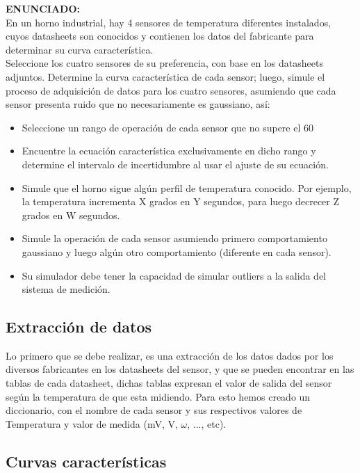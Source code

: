 \documentclass[conference]{IEEEtran}
\begin{document}
\textbf{ENUNCIADO:}\\

En un horno industrial, hay 4 sensores de temperatura diferentes instalados, cuyos datasheets son conocidos y contienen los datos del fabricante para determinar su curva característica. \\

Seleccione los cuatro sensores de su preferencia, con base en los datasheets adjuntos. Determine la curva característica de cada sensor; luego, simule el proceso de adquisición de datos para los cuatro sensores, asumiendo que cada sensor presenta ruido que no necesariamente es gaussiano, así:\\

\begin{itemize}
	\item Seleccione un rango de operación de cada sensor que no supere el 60%
	\item Encuentre la ecuación característica exclusivamente en dicho rango y determine el intervalo de incertidumbre al usar el ajuste de su ecuación.
	\item Simule que el horno sigue algún perfil de temperatura conocido. Por ejemplo, la temperatura incrementa X grados en Y segundos, para luego decrecer Z grados en W segundos. 
	\item Simule la operación de cada sensor asumiendo primero comportamiento gaussiano y luego algún otro comportamiento (diferente en cada sensor).
	\item Su simulador debe tener la capacidad de simular outliers a la salida del sistema de medición. 
\end{itemize}




\subsection{Extracci\'on de datos}

Lo primero que se debe realizar, es una extracción de los datos dados por los diversos fabricantes en los datasheets del sensor, y que se pueden encontrar en las tablas de cada datasheet, dichas tablas expresan el valor de salida del sensor según la temperatura de que esta midiendo. Para esto hemos creado un diccionario, con el nombre de cada sensor y sus respectivos valores de Temperatura y valor de medida (mV, V, $\omega$, ..., etc).\\

\subsection{Curvas caracter\'isticas}
\end{document}
